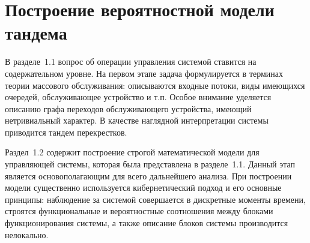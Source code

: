 \chapter{Построение вероятностной модели тандема}						%


В разделе~1.1 вопрос об операции управления системой ставится на содержательном уровне. На первом этапе задача формулируется в терминах теории массового обслуживания: описываются входные потоки,   виды имеющихся очередей,  обслуживающее устройство и т.п. Особое внимание уделяется описанию графа переходов обслуживающего устройства,  имеющий нетривиальный характер. В качестве наглядной интерпретации системы приводится тандем перекрестков. 

Раздел~1.2 содержит построение строгой математической модели для управляющей системы,  которая была представлена в разделе~1.1. Данный этап является основополагающим для всего дальнейшего анализа. При построении модели существенно используется кибернетический подход и его основные принципы: наблюдение за системой совершается в дискретные моменты времени,   строятся функциональные и вероятностные соотношения между блоками функционирования системы,  а также описание блоков системы производится нелокально.
